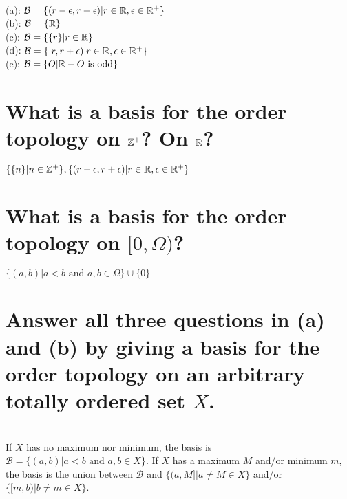 \begin{solution}
 \\(a): $\mathcal{B} = \{(r-\epsilon, r+\epsilon)|r \in \mathbb{R}, \epsilon \in \mathbb{R}^+\}$ \\
 (b): $\mathcal{B} = \{\mathbb{R}\}$ \\
 (c): $\mathcal{B} = \{\{r\}|r \in \mathbb{R}\}$ \\
 (d): $\mathcal{B} = \{[r, r+\epsilon)|r \in \mathbb{R}, \epsilon \in \mathbb{R}^+\}$ \\
 (e): $\mathcal{B} = \{O| \mathbb{R}-O \text{ is odd}\}$
\end{solution}

\question{}

\begin{parts}
 \part{What is a basis for the order topology on $\mathbb{Z}^+$? On $\mathbb{R}$?}
 
\begin{solution}
 $\{\{n\}|n \in \mathbb{Z}^+\}, \{(r-\epsilon, r+\epsilon)|r \in \mathbb{R}, \epsilon \in \mathbb{R}^+\}$
\end{solution}

\part{What is a basis for the order topology on $[0, \Omega)$?}

\begin{solution}
 $\{(a,b)| a < b \text{ and } a,b \in \Omega\} \cup \{0\}$
\end{solution}

\part{Answer all three questions in (a) and (b) by giving a basis for the order topology on an arbitrary totally ordered set $X$.}

\begin{solution}
\\ If $X$ has no maximum nor minimum, the basis is $\mathcal{B} = \{(a,b)| a < b \text{ and } a,b \in X\}$. If $X$ has a maximum $M$ and/or minimum $m$, the basis is the union between $\mathcal{B}$ and $\{(a, M]| a \neq M \in X\}$ and/or $\{[m, b)| b \neq m \in X\}$.
\end{solution}
\end{parts}


